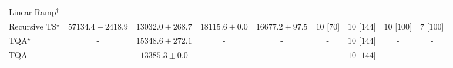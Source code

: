 \begin{tabular}{l|cccc|cccc|}
Linear Ramp$^\dagger$ & {\cellcolor[HTML]{000000}} \color[HTML]{F1F1F1} {\cellcolor{white}} \color{black} - & {\cellcolor[HTML]{000000}} \color[HTML]{F1F1F1} {\cellcolor{white}} \color{black} - & {\cellcolor[HTML]{000000}} \color[HTML]{F1F1F1} {\cellcolor{white}} \color{black} - & {\cellcolor[HTML]{000000}} \color[HTML]{F1F1F1} {\cellcolor{white}} \color{black} - & {\cellcolor[HTML]{000000}} \color[HTML]{F1F1F1} {\cellcolor{white}} \color{black} - & {\cellcolor[HTML]{000000}} \color[HTML]{F1F1F1} {\cellcolor{white}} \color{black} - & {\cellcolor[HTML]{000000}} \color[HTML]{F1F1F1} {\cellcolor{white}} \color{black} - & {\cellcolor[HTML]{000000}} \color[HTML]{F1F1F1} {\cellcolor{white}} \color{black} - \\
Recursive TS$^\star$ & {\cellcolor[HTML]{A43904}} \color[HTML]{F1F1F1} $57134.4\pm 2418.9$ & {\cellcolor[HTML]{FFFACA}} \color[HTML]{000000} $13032.0\pm 268.7$ & {\cellcolor[HTML]{FFEFAC}} \color[HTML]{000000} $18115.6\pm 0.0$ & {\cellcolor[HTML]{FFF3B4}} \color[HTML]{000000} $16677.2\pm 97.5$ & {\cellcolor[HTML]{49006A}} \color[HTML]{F1F1F1} $10$ [$70$] & {\cellcolor[HTML]{49006A}} \color[HTML]{F1F1F1} $10$ [$144$] & {\cellcolor[HTML]{49006A}} \color[HTML]{F1F1F1} $10$ [$100$] & {\cellcolor[HTML]{CD238F}} \color[HTML]{F1F1F1} $7$ [$100$] \\
TQA$^\star$ & {\cellcolor[HTML]{000000}} \color[HTML]{F1F1F1} {\cellcolor{white}} \color{black} - & {\cellcolor[HTML]{FFF7BC}} \color[HTML]{000000} $15348.6\pm 272.1$ & {\cellcolor[HTML]{000000}} \color[HTML]{F1F1F1} {\cellcolor{white}} \color{black} - & {\cellcolor[HTML]{000000}} \color[HTML]{F1F1F1} {\cellcolor{white}} \color{black} - & {\cellcolor[HTML]{000000}} \color[HTML]{F1F1F1} {\cellcolor{white}} \color{black} - & {\cellcolor[HTML]{49006A}} \color[HTML]{F1F1F1} $10$ [$144$] & {\cellcolor[HTML]{000000}} \color[HTML]{F1F1F1} {\cellcolor{white}} \color{black} - & {\cellcolor[HTML]{000000}} \color[HTML]{F1F1F1} {\cellcolor{white}} \color{black} - \\
TQA & {\cellcolor[HTML]{000000}} \color[HTML]{F1F1F1} {\cellcolor{white}} \color{black} - & {\cellcolor[HTML]{FFF9C7}} \color[HTML]{000000} $13385.3\pm 0.0$ & {\cellcolor[HTML]{000000}} \color[HTML]{F1F1F1} {\cellcolor{white}} \color{black} - & {\cellcolor[HTML]{000000}} \color[HTML]{F1F1F1} {\cellcolor{white}} \color{black} - & {\cellcolor[HTML]{000000}} \color[HTML]{F1F1F1} {\cellcolor{white}} \color{black} - & {\cellcolor[HTML]{49006A}} \color[HTML]{F1F1F1} $10$ [$144$] & {\cellcolor[HTML]{000000}} \color[HTML]{F1F1F1} {\cellcolor{white}} \color{black} - & {\cellcolor[HTML]{000000}} \color[HTML]{F1F1F1} {\cellcolor{white}} \color{black} - \\

\end{tabular}
